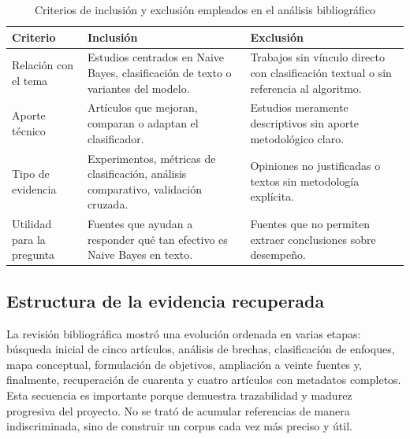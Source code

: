 \begin{table}[htbp]
\centering
\caption{Criterios de inclusión y exclusión empleados en el análisis bibliográfico}
\label{tab:criterios}
\begin{tabular}{|p{3.2cm}|p{5.8cm}|p{5.5cm}|}
\hline
\textbf{Criterio} & \textbf{Inclusión} & \textbf{Exclusión} \\
\hline
Relación con el tema & Estudios centrados en Naive Bayes, clasificación de texto o variantes del modelo. & Trabajos sin vínculo directo con clasificación textual o sin referencia al algoritmo. \\
\hline
Aporte técnico & Artículos que mejoran, comparan o adaptan el clasificador. & Estudios meramente descriptivos sin aporte metodológico claro. \\
\hline
Tipo de evidencia & Experimentos, métricas de clasificación, análisis comparativo, validación cruzada. & Opiniones no justificadas o textos sin metodología explícita. \\
\hline
Utilidad para la pregunta & Fuentes que ayudan a responder qué tan efectivo es Naive Bayes en texto. & Fuentes que no permiten extraer conclusiones sobre desempeño. \\
\hline
\end{tabular}
\end{table}

\subsection{Estructura de la evidencia recuperada}

La revisión bibliográfica mostró una evolución ordenada en varias etapas: búsqueda inicial de cinco artículos, análisis de brechas, clasificación de enfoques, mapa conceptual, formulación de objetivos, ampliación a veinte fuentes y, finalmente, recuperación de cuarenta y cuatro artículos con metadatos completos. Esta secuencia es importante porque demuestra trazabilidad y madurez progresiva del proyecto. No se trató de acumular referencias de manera indiscriminada, sino de construir un corpus cada vez más preciso y útil.

